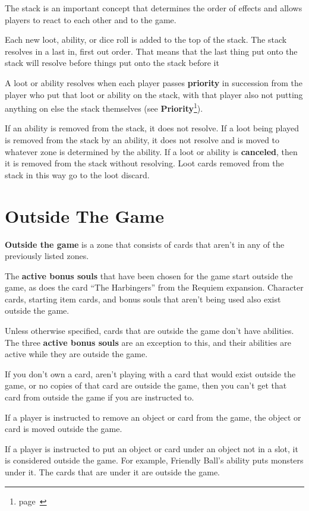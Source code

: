\documentclass[
  fontsize=10pt,
  paper=a5,
  version=last,
  chapterprefix=true,
  bindingoffset=5mm,
  ]{scrbook}
\begin{document}
    The stack is an important concept that determines the order of effects and allows players to react to each other and to the game.

    Each new loot, ability, or dice roll is added to the top of the stack. The stack resolves in a last in, first out order. That means that the last thing put onto the stack will resolve before things put onto the stack before it

    A loot or ability resolves when each player passes \textbf{priority} in succession from the player who put that loot or ability on the stack, with that player also not putting anything on else the stack themselves (see \textbf{Priority}\footnote{page~\pageref{priority}}).

    If an ability is removed from the stack, it does not resolve. If a loot being played is removed from the stack by an ability, it does not resolve and is moved to whatever zone is determined by the ability. If a loot or ability is \textbf{canceled}, then it is removed from the stack without resolving. Loot cards removed from the stack in this way go to the loot discard.

    \section{Outside The Game}
    \textbf{Outside the game} is a zone that consists of cards that aren’t in any of the previously listed zones.

    The \textbf{active bonus souls} that have been chosen for the game start outside the game, as does the card “The Harbingers” from the Requiem expansion. Character cards, starting item cards, and bonus souls that aren’t being used also exist outside the game.

    Unless otherwise specified, cards that are outside the game don’t have abilities. The three \textbf{active bonus souls} are an exception to this, and their abilities are active while they are outside the game.

    If you don’t own a card, aren’t playing with a card that would exist outside the game, or no copies of that card are outside the game, then you can’t get that card from outside the game if you are instructed to.

    If a player is instructed to remove an object or card from the game, the object or card is moved outside the game.

    If a player is instructed to put an object or card under an object not in a slot, it is considered outside the game. For example, Friendly Ball’s ability puts monsters under it. The cards that are under it are outside the game.
\end{document}
